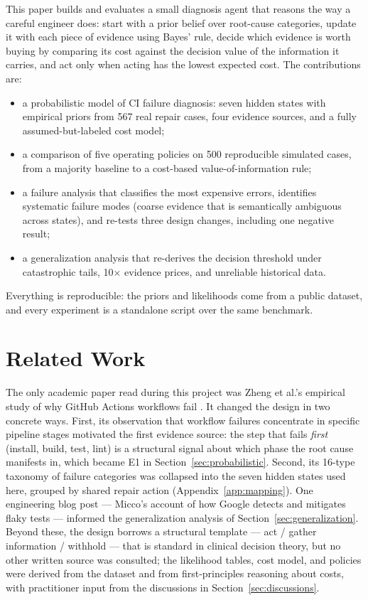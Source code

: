 \documentclass{article}
\begin{document}
This paper builds and evaluates a small diagnosis agent that reasons the way a careful engineer does: start with a prior belief over root-cause categories, update it with each piece of evidence using Bayes' rule, decide which evidence is worth buying by comparing its cost against the decision value of the information it carries, and act only when acting has the lowest expected cost. The contributions are:

\begin{itemize}
\item a probabilistic model of CI failure diagnosis: seven hidden states with empirical priors from 567 real repair cases, four evidence sources, and a fully assumed-but-labeled cost model;
\item a comparison of five operating policies on 500 reproducible simulated cases, from a majority baseline to a cost-based value-of-information rule;
\item a failure analysis that classifies the most expensive errors, identifies systematic failure modes (coarse evidence that is semantically ambiguous across states), and re-tests three design changes, including one negative result;
\item a generalization analysis that re-derives the decision threshold under catastrophic tails, 10$\times$ evidence prices, and unreliable historical data.
\end{itemize}

Everything is reproducible: the priors and likelihoods come from a public dataset, and every experiment is a standalone script over the same benchmark.

\section{Related Work}

The only academic paper read during this project was Zheng et al.'s empirical study of why GitHub Actions workflows fail \cite{zheng2025gha}. It changed the design in two concrete ways. First, its observation that workflow failures concentrate in specific pipeline stages motivated the first evidence source: the step that fails \emph{first} (install, build, test, lint) is a structural signal about which phase the root cause manifests in, which became E1 in Section~\ref{sec:probabilistic}. Second, its 16-type taxonomy of failure categories was collapsed into the seven hidden states used here, grouped by shared repair action (Appendix~\ref{app:mapping}). One engineering blog post --- Micco's account of how Google detects and mitigates flaky tests \cite{micco2016flaky} --- informed the generalization analysis of Section~\ref{sec:generalization}. Beyond these, the design borrows a structural template --- act / gather information / withhold --- that is standard in clinical decision theory, but no other written source was consulted; the likelihood tables, cost model, and policies were derived from the dataset and from first-principles reasoning about costs, with practitioner input from the discussions in Section~\ref{sec:discussions}.
\end{document}

